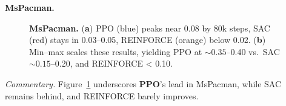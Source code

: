 \noindent \textbf{MsPacman.}
\begin{figure}[htbp]
	\centering
	\quad
	\caption{\textbf{MsPacman.}
		(\textbf{a}) PPO (blue) peaks near 0.08 by 80k steps, SAC (red) stays in 0.03--0.05, REINFORCE (orange) below 0.02.
		(\textbf{b}) Min--max scales these results, yielding PPO at \(\sim0.35\)--0.40 vs.\ SAC \(\sim0.15\)--0.20, and REINFORCE < 0.10.}
	\label{fig:mspacman_combined}
\end{figure}

\noindent
\emph{Commentary.} Figure~\ref{fig:mspacman_combined} underscores \textbf{PPO}’s lead in MsPacman, while SAC remains behind, and REINFORCE barely improves.

\medskip


